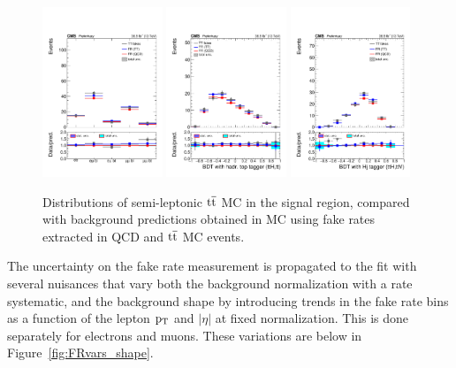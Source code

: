 \begin{figure}[htb]
        \centering 
        \includegraphics[width=0.32\textwidth]{ch10_figs/2lep_catIndex_nosign.pdf}
        \includegraphics[width=0.32\textwidth]{ch10_figs/kinMVA_2lss_ttbar_withBDTv8.pdf}
        \includegraphics[width=0.32\textwidth]{ch10_figs/kinMVA_2lss_ttV_withHj.pdf}
        \caption[MC validation plots of FR method]{Distributions of semi-leptonic $\mathrm{t}\overline{\mathrm{t}}$ MC in the signal region, compared with background predictions obtained
          in MC using fake rates extracted in QCD and $\mathrm{t}\overline{\mathrm{t}}$ MC events.}
        \label{fig:closure}
\end{figure}

The uncertainty on the fake rate measurement is propagated to the fit with several nuisances that vary both
the background normalization with a rate systematic, and the background shape by introducing trends
in the fake rate bins as a function of the lepton $\mathrm{p}_{\mathrm{T}}$ and $|\eta|$  at fixed normalization.
This is done separately for electrons and muons. These variations are below in Figure~\ref{fig:FRvars_shape}.

